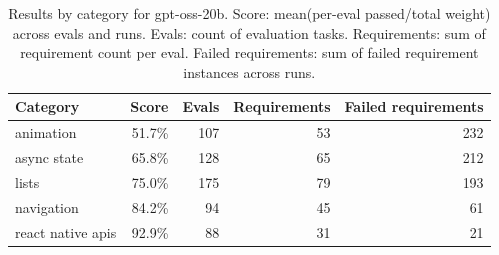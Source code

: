 \begin{table}[htbp]
\centering
\begin{tabular}{lrrrr}
\toprule
Category & Score & Evals & Requirements & Failed requirements \\
\midrule
animation & 51.7\% & 107 & 53 & 232 \\
async state & 65.8\% & 128 & 65 & 212 \\
lists & 75.0\% & 175 & 79 & 193 \\
navigation & 84.2\% & 94 & 45 & 61 \\
react native apis & 92.9\% & 88 & 31 & 21 \\
\bottomrule
\end{tabular}
\caption{Results by category for gpt-oss-20b. Score: mean(per-eval passed/total weight) across evals and runs. Evals: count of evaluation tasks. Requirements: sum of requirement count per eval. Failed requirements: sum of failed requirement instances across runs.}
\end{table}
